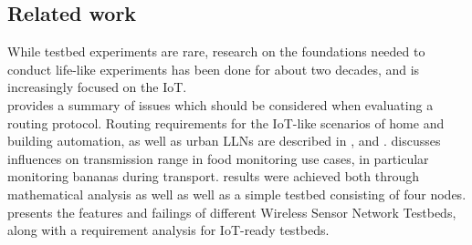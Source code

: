 \documentclass{acm_proc_article-sp}
\begin{document}
\subsection{Related work}
\label{subsec:related_work}
While testbed experiments are rare, research on the foundations needed to conduct life-like experiments has been done for about two decades, and is increasingly focused on the IoT.\\
\cite{RFC-2501} provides a summary of issues which should be considered when evaluating a routing protocol. Routing requirements for the IoT-like scenarios of home and building automation, as well as urban \glspl{LLN} are described in \cite{RFC-5826}, \cite{RFC-5867} and \cite{RFC-5548}.
\cite{food_monitoring} discusses influences on transmission range in food monitoring use cases, in particular monitoring bananas during transport. results were achieved both through mathematical analysis as well as well as a simple testbed consisting of four nodes.
\cite{testbed-survey} presents the features and failings of different Wireless Sensor Network Testbeds, along with a requirement analysis for IoT-ready testbeds.
\end{document}
